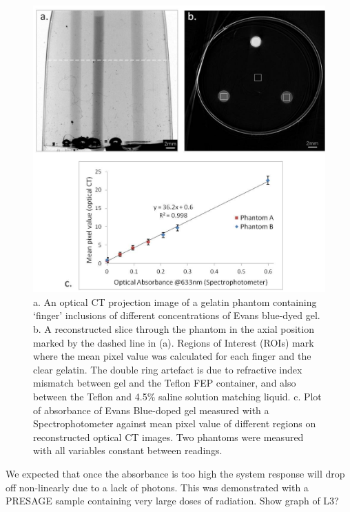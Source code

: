	\begin{figure}[H]
		\centering
		\includegraphics[width=1\textwidth]{meth_img/EB_rod_new.jpg}
		\caption{a. An optical CT projection image of a gelatin phantom containing `finger' inclusions of different concentrations of Evans blue-dyed gel. b. A reconstructed slice through the phantom in the axial position marked by the dashed line in (a). Regions of Interest (ROIs) mark where the mean pixel value was calculated for each finger and the clear gelatin. The double ring artefact is due to refractive index mismatch between gel and the Teflon FEP container, and also between the Teflon and 4.5\% saline solution matching liquid. c. Plot of absorbance of Evans Blue-doped gel measured with a Spectrophotometer against mean pixel value of different regions on reconstructed optical CT images. Two phantoms were measured  with all  variables constant between readings.}
		\label{fig:fingerphantoms_roi_EB}
	\end{figure}
	



We expected that once the absorbance is too high the system response will drop off non-linearly due to a lack of photons. This was demonstrated with a PRESAGE sample containing very large doses of radiation. Show graph of L3?







